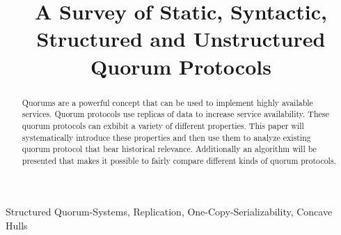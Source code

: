 \documentclass[conference]{IEEEtran}
\begin{document}
\title{A Survey of Static, Syntactic, Structured and Unstructured Quorum Protocols}

\author{
}

\maketitle
\thispagestyle{plain}
\pagestyle{plain}

\begin{abstract}
Quorums are a powerful concept that can be used to implement highly available
services.
Quorum protocols use replicas of data to increase service availability.
These quorum protocols can exbibit a variety of different properties.
This paper will systematically introduce these properties and then use them
to analyze existing quorum protocol that bear historical relevance.
Additionally an algorithm will be presented that makes it possible to fairly
compare different kinds of quorum protocols.
\end{abstract}

\begin{keywords}
Structured Quorum-Systems, Replication, One-Copy-Serializability, Concave Hulls
\end{keywords}
\end{document}
